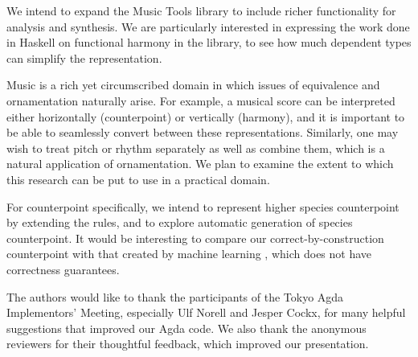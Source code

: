 \documentclass[sigplan,screen]{acmart}
\begin{document}
We intend to expand the Music Tools library to include
richer functionality for analysis and synthesis. We are
particularly interested in expressing the work done in Haskell
on functional harmony in the library, to see how much
dependent types can simplify the representation.

Music is a rich yet circumscribed domain in which
issues of equivalence \citep{tabareau2017equivalences}
and ornamentation \citep{dagand2017essence} naturally arise.
For example, a
musical score can be interpreted either horizontally (counterpoint) or
vertically (harmony), and it is important to be able to seamlessly
convert between these representations. Similarly, one may wish to treat
pitch or rhythm separately as well as combine them, which is a natural
application of ornamentation. We plan to examine the extent to which this
research can be put to use in a practical domain.

For counterpoint specifically, we intend to represent higher species 
counterpoint by extending the rules, 
and to explore automatic generation of species counterpoint.
It would be interesting to compare our correct-by-construction counterpoint
with that created by machine learning \citep{CounterpointByConvolution}, 
which does not have correctness guarantees.

\begin{acks}                            %
 The authors would like to thank the participants of the Tokyo Agda 
 Implementors' Meeting, especially Ulf Norell and Jesper Cockx,
 for many helpful suggestions that improved our Agda code.
 We also thank the anonymous reviewers for their thoughtful feedback,
 which improved our presentation.
\end{acks}



\end{document}
